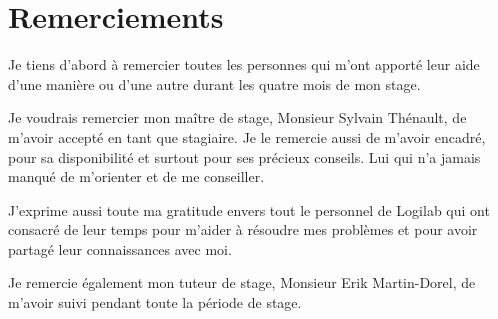 \chapter*{Remerciements}
Je tiens d’abord à remercier toutes les personnes qui m’ont apporté leur aide d’une manière ou d’une autre durant les quatre mois de mon stage.

Je voudrais remercier mon maître de stage, Monsieur Sylvain Thénault, de m’avoir accepté en tant que stagiaire. Je le remercie aussi de m’avoir encadré, pour sa disponibilité et surtout pour ses précieux conseils. Lui qui n’a jamais manqué de m’orienter et de me conseiller.

J’exprime aussi toute ma gratitude envers tout le personnel de Logilab qui ont consacré de leur temps pour m'aider à résoudre mes problèmes et pour avoir partagé leur connaissances avec moi.

Je remercie également mon tuteur de stage, Monsieur Erik Martin-Dorel, de m’avoir suivi pendant toute la période de stage.